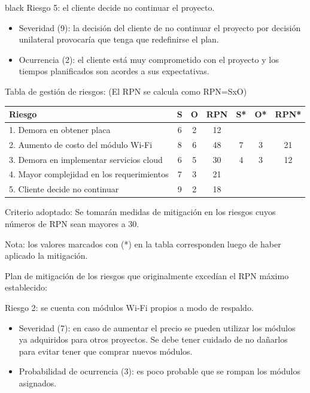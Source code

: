 \documentclass[
11pt, %
codirector, %
]{charter}
\begin{document}
\begin{consigna}{black}
Riesgo 5: el cliente decide no continuar el proyecto.
\begin{itemize}
	\item Severidad (9):  la decisión del cliente de no continuar el proyecto por decisión unilateral provocaría que tenga que redefinirse el plan.
	\item Ocurrencia (2): el cliente está muy comprometido con el proyecto y los tiempos planificados son acordes a sus expectativas.
\end{itemize}

Tabla de gestión de riesgos:      (El RPN se calcula como RPN=SxO)

\begin{table}[htpb]
\centering
\begin{tabularx}{\linewidth}{@{}|X|c|c|c|c|c|c|@{}}
\hline
\rowcolor[HTML]{C0C0C0} 
Riesgo & S & O & RPN & S* & O* & RPN* \\ \hline
 1. Demora en obtener placa      & 6  & 2  &  12   &    &    &      \\ \hline
 2. Aumento de costo del módulo Wi-Fi      &  8 &  6 &  48   &  7  &  3  &     21 \\ \hline
 3. Demora en implementar servicios cloud      & 6  &  5 &  30   &  4  &   3 &    12  \\ \hline
  4. Mayor complejidad en los requerimientos     & 7  &  3 &  21   &    &    &      \\ \hline
 5. Cliente decide no continuar      & 9  &  2 &  18   &    &    &      \\ \hline
\end{tabularx}%
\end{table}

Criterio adoptado: 
Se tomarán medidas de mitigación en los riesgos cuyos números de RPN sean mayores a 30.

Nota: los valores marcados con (*) en la tabla corresponden luego de haber aplicado la mitigación.

Plan de mitigación de los riesgos que originalmente excedían el RPN máximo establecido:
 
Riesgo 2: se cuenta con módulos Wi-Fi propios a modo de respaldo.
  
  \begin{itemize}
  \item Severidad (7): en caso de aumentar el precio se pueden utilizar los módulos ya adquiridos para otros proyectos. Se debe tener cuidado de no dañarlos para evitar tener que comprar nuevos módulos.
  \item Probabilidad de ocurrencia (3): es poco probable que se rompan los módulos asignados.
  \end{itemize}
 

\end{consigna}
\end{document}
